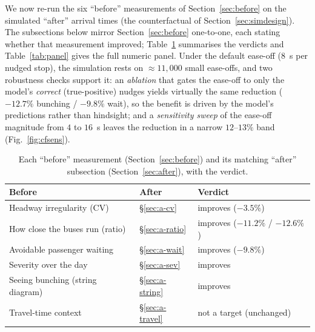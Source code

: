 \documentclass[final,5p,times,twocolumn,authoryear]{elsarticle}
\begin{document}
We now re-run the six ``before'' measurements of Section~\ref{sec:before} on the simulated ``after''
arrival times (the counterfactual of Section~\ref{sec:simdesign}). The subsections below mirror
Section~\ref{sec:before} one-to-one, each stating whether that measurement improved;
Table~\ref{tab:mirror} summarises the verdicts and Table~\ref{tab:panel} gives the full numeric
panel. Under the default ease-off ($8$~s per nudged stop), the simulation rests on $\approx$$11{,}000$
small ease-offs, and two robustness checks support it: an \emph{ablation} that gates the ease-off to
only the model's \emph{correct} (true-positive) nudges yields virtually the same reduction
($-12.7\%$ bunching / $-9.8\%$ wait), so the benefit is driven by the model's predictions rather than
hindsight; and a \emph{sensitivity sweep} of the ease-off magnitude from $4$ to $16$~s leaves the
reduction in a narrow $12$--$13\%$ band (Fig.~\ref{fig:cfsens}).

\begin{table}[t]
\centering
\small
\caption{Each ``before'' measurement (Section~\ref{sec:before}) and its matching ``after''
subsection (Section~\ref{sec:after}), with the verdict.}
\label{tab:mirror}
\begin{tabular}{lll}
\toprule
Before & After & Verdict \\
\midrule
Headway irregularity (CV)        & §\ref{sec:a-cv}     & improves ($-3.5\%$) \\
How close the buses run (ratio)  & §\ref{sec:a-ratio}  & improves ($-11.2\%$ / $-12.6\%$) \\
Avoidable passenger waiting      & §\ref{sec:a-wait}   & improves ($-9.8\%$) \\
Severity over the day            & §\ref{sec:a-sev}    & improves \\
Seeing bunching (string diagram) & §\ref{sec:a-string} & improves \\
Travel-time context              & §\ref{sec:a-travel} & not a target (unchanged) \\
\bottomrule
\end{tabular}
\end{table}
\end{document}
